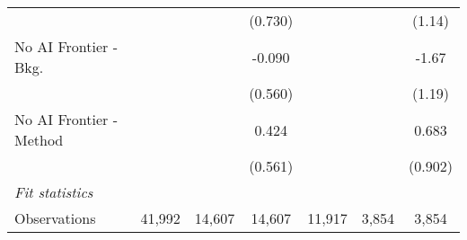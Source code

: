 \begin{tabular}{lcccccc}
                           &         &         & (0.730)       &         &         & (1.14)\\   
   No AI Frontier - Bkg.   &         &         & -0.090        &         &         & -1.67\\   
                           &         &         & (0.560)       &         &         & (1.19)\\   
   No AI Frontier - Method &         &         & 0.424         &         &         & 0.683\\   
                           &         &         & (0.561)       &         &         & (0.902)\\   
   \midrule
   \emph{Fit statistics}\\
   Observations            & 41,992  & 14,607  & 14,607        & 11,917  & 3,854   & 3,854\\  
   

\end{tabular}
